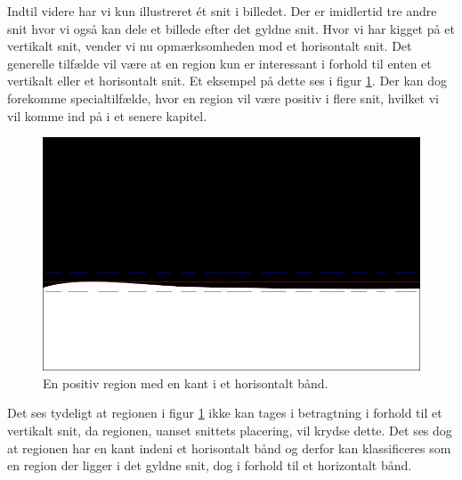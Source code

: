 {Indtil videre har vi kun illustreret ét snit i billedet.  Der er
imidlertid tre andre snit hvor vi også kan dele et billede efter det
gyldne snit.  Hvor vi har kigget på et vertikalt snit, vender vi nu
opmærksomheden mod et horisontalt snit.  Det generelle tilfælde vil være
at en region kun er interessant i forhold til enten et vertikalt eller
et horisontalt snit.  Et eksempel på dette ses i figur
\ref{pos_horiz_naiv_margin_1}.  Der kan dog forekomme specialtilfælde,
hvor en region vil være positiv i flere snit, hvilket vi vil komme ind
på i et senere kapitel.
\begin{figure}[H]
    \begin{center}
        \includegraphics[scale=\imgscale,angle=0]{afsnit/vores_implementation/billeder/naiv_algoritme/naiv_horiz_positiv_blob_1}
    \end{center}
    \caption[Positiv horisontal region]{En positiv region med en
    kant i et horisontalt bånd.}
    \label{pos_horiz_naiv_margin_1}
\end{figure}
Det ses tydeligt at regionen i figur \ref{pos_horiz_naiv_margin_1} ikke
kan tages i betragtning i forhold til et vertikalt snit, da regionen,
uanset snittets placering, vil krydse dette.  Det ses dog at regionen
har en kant indeni et horisontalt bånd og derfor kan klassificeres som
en region der ligger i det gyldne snit, dog i forhold til et horizontalt
bånd.

}
